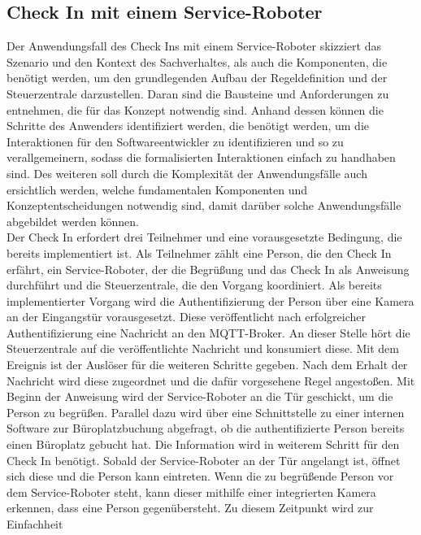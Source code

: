 \subsection{Check In mit einem Service-Roboter}
    Der Anwendungsfall des Check Ins mit einem Service-Roboter skizziert das Szenario und den Kontext des Sachverhaltes, als 
    auch die Komponenten, die benötigt werden, um den grundlegenden Aufbau der Regeldefinition und der Steuerzentrale 
    darzustellen. Daran sind die Bausteine und Anforderungen zu entnehmen, die für das Konzept notwendig sind. Anhand 
    dessen können die Schritte des Anwenders identifiziert werden, die benötigt werden, um die Interaktionen für den 
    Softwareentwickler zu identifizieren und so zu verallgemeinern, sodass die formalisierten Interaktionen einfach zu 
    handhaben sind. Des weiteren soll durch die Komplexität der Anwendungsfälle auch ersichtlich werden, welche fundamentalen 
    Komponenten und Konzeptentscheidungen notwendig sind, damit darüber solche Anwendungsfälle abgebildet werden können.
    \\
    \linebreak
    Der Check In erfordert drei Teilnehmer und eine vorausgesetzte Bedingung, die bereits implementiert ist. Als Teilnehmer 
    zählt eine Person, die den Check In erfährt, ein Service-Roboter, der die Begrüßung und das Check In als Anweisung 
    durchführt und die Steuerzentrale, die den Vorgang koordiniert. Als bereits implementierter Vorgang wird die 
    Authentifizierung der Person über eine Kamera an der Eingangstür vorausgesetzt. Diese veröffentlicht nach erfolgreicher 
    Authentifizierung eine Nachricht an den \acs{MQTT}-Broker. An dieser Stelle hört die Steuerzentrale auf die 
    veröffentlichte Nachricht und konsumiert diese. Mit dem Ereignis ist der Auslöser für die weiteren Schritte gegeben. Nach 
    dem Erhalt der Nachricht wird diese zugeordnet und die dafür vorgesehene Regel angestoßen. Mit Beginn der Anweisung wird 
    der Service-Roboter an die Tür geschickt, um die Person zu begrüßen. Parallel dazu wird über eine Schnittstelle zu einer 
    internen Software zur Büroplatzbuchung abgefragt, ob die authentifizierte Person bereits einen Büroplatz gebucht hat. 
    Die Information wird in weiterem Schritt für den Check In benötigt. Sobald der Service-Roboter an der Tür angelangt ist, 
    öffnet sich diese und die Person kann eintreten. Wenn die zu begrüßende Person vor dem Service-Roboter steht, kann dieser 
    mithilfe einer integrierten Kamera erkennen, dass eine Person gegenübersteht. Zu diesem Zeitpunkt wird zur Einfachheit 
